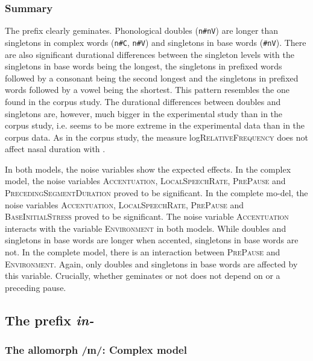 \subsubsection{Summary}


The prefix  clearly geminates. Phonological doubles (\texttt{n\#nV})  are longer than singletons in complex words (\texttt{n\#C}, \texttt{n\#V}) and singletons in base words (\texttt{\#nV}). There are also significant durational differences between the singleton levels with the singletons in base words being the longest, the singletons in prefixed words followed by a consonant being the second longest and the singletons in prefixed words followed by a vowel being the shortest. This pattern resembles the one found in the corpus study. The durational differences between doubles and singletons are, however, much bigger in the experimental study than in the corpus study, i.e.  seems to be more extreme in the experimental data than in the corpus data. 
As in the corpus study, the  measure log\textsc{RelativeFrequency} does not affect nasal duration with .


 In both models, the noise variables show the expected effects. In the complex model, the noise variables \textsc{Accentuation}, \textsc{LocalSpeechRate}, \textsc{PrePause} and \textsc{PrecedingSegmentDuration} proved to be significant. In the complete mo-del, the noise variables \textsc{Accentuation}, \textsc{LocalSpeechRate}, \textsc{PrePause} and \textsc{BaseInitialStress} proved to be significant.
 The noise variable \textsc{Accentuation} interacts with the variable \textsc{Environment} in both models. While doubles and singletons in base words are longer when accented, singletons in base words are not. In the complete model, there is an interaction between \textsc{PrePause} and \textsc{Environment}. Again, only doubles and singletons in base words are affected by this variable. Crucially,  whether  geminates or not does not depend on  or a preceding pause. 


\subsection{The prefix \textit{in-}} \label{in experiment}

\subsubsection{The allomorph /ɪn/: Complex model}

